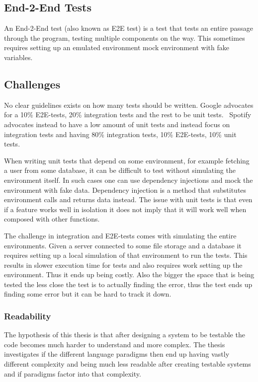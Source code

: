 \subsection{End-2-End Tests}

An End-2-End test (also known as E2E test) is a test that tests an entire
passage through the program, testing multiple components on the way. This
sometimes requires setting up an emulated environment mock environment with fake
variables.

\subsection{Challenges}

No clear guidelines exists on how many tests should be written. Google
advocates for a 10\% E2E-tests, 20\% integration tests and the rest to be unit
tests.~\cite{googleontests} Spotify advocates instead to have a low amount of
unit tests and instead focus on integration tests and having 80\% integration
tests, 10\% E2E-tests, 10\% unit tests.~\cite{spotifyontests}

When writing unit tests that depend on some environment, for example fetching a
user from some database, it can be difficult to test without simulating the
environment itself. In such cases one can use dependency injections and mock the
environment with fake data. Dependency injection is a method that substitutes
environment calls and returns data instead. The issue with unit tests is that
even if a feature works well in isolation it does not imply that it will work
well when composed with other functions.

The challenge in integration and E2E-tests comes with simulating the entire
environments. Given a server connected to some file storage and a database it
requires setting up a local simulation of that environment to run the tests.
This results in slower execution time for tests and also requires work setting
up the environment. Thus it ends up being costly. Also the bigger the space
that is being tested the less close the test is to actually finding the error,
thus the test ends up finding some error but it can be hard to track it down.

\subsubsection{Readability}

The hypothesis of this thesis is that after designing a system to be testable
the code becomes much harder to understand and more complex. The thesis
investigates if the different language paradigms then end up having vastly
different complexity and being much less readable after creating testable
systems and if paradigms factor into that complexity. 

